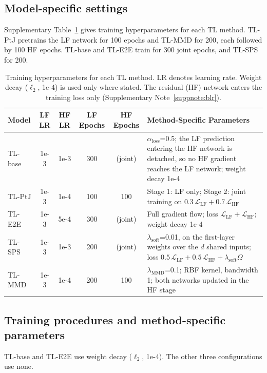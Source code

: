 \subsection{Model-specific settings}
\label{suppsec:model_settings}
Supplementary Table~\ref{supptab:model_hyperparams} gives training hyperparameters for each TL method. TL-PtJ pretrains the LF network for 100 epochs and TL-MMD for 200, each followed by 100 HF epochs. TL-base and TL-E2E train for 300 joint epochs, and TL-SPS for 200.

\begin{table}[h]
\centering
\caption{Training hyperparameters for each TL method. LR denotes learning rate. Weight decay ($\ell_2$, 1e-4) is used only where stated. The residual (HF) network enters the training loss only (Supplementary Note~\ref{suppnote:blr}).}
\label{supptab:model_hyperparams}
{\footnotesize%
\begin{tabular}{@{}>{\raggedright\arraybackslash}p{2.3cm}cccc>{\raggedright\arraybackslash}p{5.0cm}@{}}
\toprule
\textbf{Model} & \textbf{LF LR} & \textbf{HF LR} & \textbf{LF Epochs} & \textbf{HF Epochs} & \textbf{Method-Specific Parameters} \\
\midrule
TL-base & 1e-3 & 1e-3 & 300 & (joint) & $\alpha_{\text{loss}}$=0.5; the LF prediction entering the HF network is detached, so no HF gradient reaches the LF network; weight decay 1e-4 \\
TL-PtJ & 1e-3 & 1e-4 & 100 & 100 & Stage 1: LF only; Stage 2: joint training on $0.3\,\mathcal{L}_{\text{LF}} + 0.7\,\mathcal{L}_{\text{HF}}$ \\
TL-E2E & 1e-3 & 5e-4 & 300 & (joint) & Full gradient flow; loss $\mathcal{L}_{\text{LF}} + \mathcal{L}_{\text{HF}}$; weight decay 1e-4 \\
TL-SPS & 1e-3 & 1e-3 & 200 & (joint) & $\lambda_{\text{soft}}$=0.01, on the first-layer weights over the $d$ shared inputs; loss $0.5\,\mathcal{L}_{\text{LF}} + 0.5\,\mathcal{L}_{\text{HF}} + \lambda_{\text{soft}}\Omega$ \\
TL-MMD & 1e-3 & 1e-4 & 200 & 100 & $\lambda_{\text{MMD}}$=0.1; RBF kernel, bandwidth 1; both networks updated in the HF stage \\
\bottomrule
\end{tabular}%
}
\end{table}

\subsection{Training procedures and method-specific parameters}
\label{suppsec:training_procedures}
TL-base and TL-E2E use weight decay ($\ell_2$, 1e-4). The other three configurations use none.

